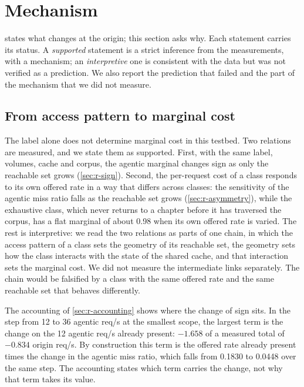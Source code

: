 \section{Mechanism}\label{sec:mechanism}
 states what changes at the origin; this section asks why.
Each statement carries its status.
A \emph{supported} statement is a strict inference from the measurements, with a
mechanism; an \emph{interpretive} one is consistent with the data but was not verified as
a prediction.
We also report the prediction that failed and the part of the mechanism that we did not
measure.

\subsection{From access pattern to marginal cost}\label{sec:m-chain}
The label alone does not determine marginal cost in this testbed.
Two relations are measured, and we state them as supported.
First, with the same label, volumes, cache and corpus, the agentic marginal changes sign as
only the reachable set grows (\cref{sec:r-sign}).
Second, the per-request cost of a class responds to its own offered rate in a way that
differs across classes: the sensitivity of the agentic miss ratio falls as the reachable
set grows (\cref{sec:r-asymmetry}), while the exhaustive class, which never returns to a
chapter before it has traversed the corpus, has a flat marginal of about 0.98 when its own
offered rate is varied.
The rest is interpretive: we read the two relations as parts of one chain, in which the
access pattern of a class sets the geometry of its reachable set, the geometry sets how the
class interacts with the state of the shared cache, and that interaction sets the marginal
cost.
We did not measure the intermediate links separately.
The chain would be falsified by a class with the same offered rate and the same reachable
set that behaves differently.

The accounting of \cref{sec:r-accounting} shows where the change of sign sits.
In the step from 12 to 36 agentic req/s at the smallest scope, the largest term is the
change on the 12 agentic req/s already present: $-1.658$ of a measured total of $-0.834$
origin req/s.
By construction this term is the offered rate already present times the change in the
agentic miss ratio, which falls from 0.1830 to 0.0448 over the same step.
The accounting states which term carries the change, not why that term takes its
value.

